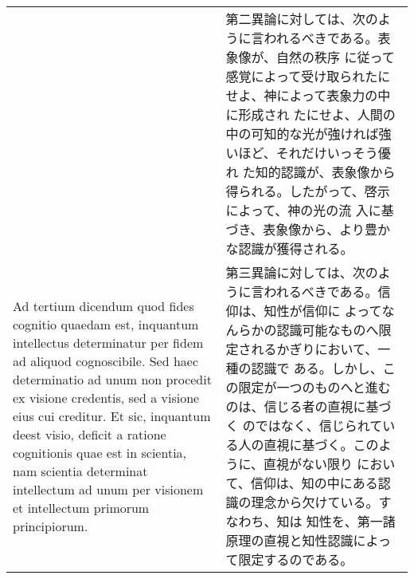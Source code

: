 \documentclass[10pt]{jsarticle} %
\begin{document}
\begin{longtable}{p{21em}p{21em}}
&

第二異論に対しては、次のように言われるべきである。表象像が、自然の秩序
に従って感覚によって受け取られたにせよ、神によって表象力の中に形成され
たにせよ、人間の中の可知的な光が強ければ強いほど、それだけいっそう優れ
た知的認識が、表象像から得られる。したがって、啓示によって、神の光の流
入に基づき、表象像から、より豊かな認識が獲得される。

\\

{\sc Ad tertium dicendum} quod fides cognitio quaedam est, inquantum
intellectus determinatur per fidem ad aliquod cognoscibile. Sed haec
determinatio ad unum non procedit ex visione credentis, sed a visione
eius cui creditur. Et sic, inquantum deest visio, deficit a ratione
cognitionis quae est in scientia, nam scientia determinat intellectum
ad unum per visionem et intellectum primorum principiorum.

&

第三異論に対しては、次のように言われるべきである。信仰は、知性が信仰に
よってなんらかの認識可能なものへ限定されるかぎりにおいて、一種の認識で
ある。しかし、この限定が一つのものへと進むのは、信じる者の直視に基づく
のではなく、信じられている人の直視に基づく。このように、直視がない限り
において、信仰は、知の中にある認識の理念から欠けている。すなわち、知は
知性を、第一諸原理の直視と知性認識によって限定するのである。

\end{longtable}
\end{document}
